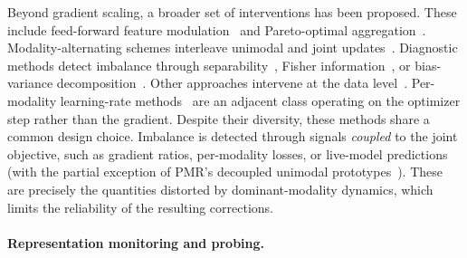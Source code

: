 \documentclass{article}
\begin{document}
Beyond gradient scaling, a broader set of interventions has been proposed. These include feed-forward feature modulation~\citep{wei2024opm} and Pareto-optimal aggregation~\citep{wei2024mmpareto}. Modality-alternating schemes interleave unimodal and joint updates~\citep{hua2024reconboost,zhang2024mla}. Diagnostic methods detect imbalance through separability~\citep{wei2024dr}, Fisher information~\citep{huang2025inforeg}, or bias-variance decomposition~\citep{wei2025improving}. Other approaches intervene at the data level~\citep{ma2025remixing,yu2026tcmax}. Per-modality learning-rate methods~\citep{yao2022mslr,guerra2025miles} are an adjacent class operating on the optimizer step rather than the gradient. Despite their diversity, these methods share a common design choice. Imbalance is detected through signals \emph{coupled} to the joint objective, such as gradient ratios, per-modality losses, or live-model predictions (with the partial exception of PMR's decoupled unimodal prototypes~\citep{fan2023pmr}). These are precisely the quantities distorted by dominant-modality dynamics, which limits the reliability of the resulting corrections.


\paragraph{Representation monitoring and probing.}
\end{document}
